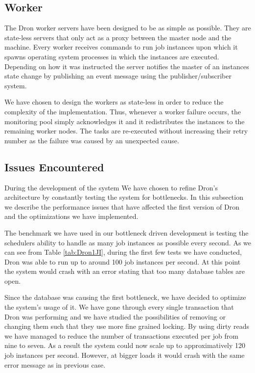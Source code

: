 \documentclass[11pt,a4paper,twoside]{report}
\begin{document}
\subsection{Worker}
The Dron worker servers have been designed to be as simple as possible. They are state-less servers that only act as a proxy between the master node and the machine. Every worker receives commands to run job instances upon which it spawns operating system processes in which the instances are executed. Depending on how it was instructed the server notifies the master of an instances state change by publishing an event message using the publisher/subscriber system.


We have chosen to design the workers as state-less in order to reduce the complexity of the implementation. Thus, whenever a worker failure occurs, the monitoring pool simply acknowledges it and it redistributes the instances to the remaining worker nodes. The tasks are re-executed without increasing their retry number as the failure was caused by an unexpected cause.

\subsection{Issues Encountered}
During the development of the system We have chosen to refine Dron's architecture by constantly testing the system for bottlenecks. In this subsection we describe the performance issues that have affected the first version of Dron and the optimizations we have implemented.


The benchmark we have used in our bottleneck driven development is testing the schedulers ability to handle as many job instances as possible every second. As we can see from Table \ref{tab:Dron1JI}, during the first few tests we have conducted, Dron was able to run up to around 100 job instances per second. At this point the system would crash with an error stating that too many database tables are open.


Since the database was causing the first bottleneck, we have decided to optimize the system's usage of it. We have gone through every single transaction that Dron was performing and we have studied the possibilities of removing or changing them such that they use more fine grained locking. By using dirty reads we have managed to reduce the number of transactions executed per job from nine to seven. As a result the system could now scale up to approximatively 120 job instances per second. However, at bigger loads it would crash with the same error message as in previous case.
\end{document}
